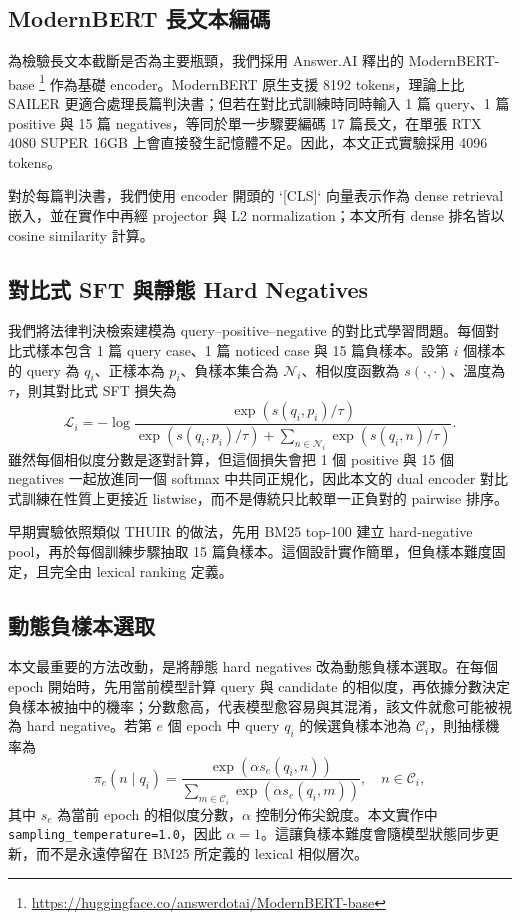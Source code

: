 \subsection{ModernBERT 長文本編碼}

為檢驗長文本截斷是否為主要瓶頸，我們採用 Answer.AI 釋出的 ModernBERT-base \cite{warner2024modernbert}\footnote{\url{https://huggingface.co/answerdotai/ModernBERT-base}} 作為基礎 encoder。ModernBERT 原生支援 8192 tokens，理論上比 SAILER 更適合處理長篇判決書；但若在對比式訓練時同時輸入 1 篇 query、1 篇 positive 與 15 篇 negatives，等同於單一步驟要編碼 17 篇長文，在單張 RTX 4080 SUPER 16GB 上會直接發生記憶體不足。因此，本文正式實驗採用 4096 tokens。

對於每篇判決書，我們使用 encoder 開頭的 `[CLS]` 向量表示作為 dense retrieval 嵌入，並在實作中再經 projector 與 L2 normalization；本文所有 dense 排名皆以 cosine similarity 計算。

\subsection{對比式 SFT 與靜態 Hard Negatives}

我們將法律判決檢索建模為 query--positive--negative 的對比式學習問題。每個對比式樣本包含 1 篇 query case、1 篇 noticed case 與 15 篇負樣本。設第 $i$ 個樣本的 query 為 $q_i$、正樣本為 $p_i$、負樣本集合為 $\mathcal{N}_i$、相似度函數為 $s(\cdot,\cdot)$、溫度為 $\tau$，則其對比式 SFT 損失為
\begin{equation}
\mathcal{L}_i=
-\log
\frac{\exp\left(s(q_i,p_i)/\tau\right)}
{\exp\left(s(q_i,p_i)/\tau\right)+\sum_{n \in \mathcal{N}_i}\exp\left(s(q_i,n)/\tau\right)}.
\end{equation}
雖然每個相似度分數是逐對計算，但這個損失會把 1 個 positive 與 15 個 negatives 一起放進同一個 softmax 中共同正規化，因此本文的 dual encoder 對比式訓練在性質上更接近 listwise，而不是傳統只比較單一正負對的 pairwise 排序。

早期實驗依照類似 THUIR 的做法，先用 BM25 top-100 建立 hard-negative pool，再於每個訓練步驟抽取 15 篇負樣本。這個設計實作簡單，但負樣本難度固定，且完全由 lexical ranking 定義。

\subsection{動態負樣本選取}

本文最重要的方法改動，是將靜態 hard negatives 改為動態負樣本選取。在每個 epoch 開始時，先用當前模型計算 query 與 candidate 的相似度，再依據分數決定負樣本被抽中的機率；分數愈高，代表模型愈容易與其混淆，該文件就愈可能被視為 hard negative。若第 $e$ 個 epoch 中 query $q_i$ 的候選負樣本池為 $\mathcal{C}_i$，則抽樣機率為
\begin{equation}
\pi_e(n \mid q_i)=
\frac{\exp\left(\alpha s_e(q_i,n)\right)}
{\sum_{m \in \mathcal{C}_i}\exp\left(\alpha s_e(q_i,m)\right)},
\quad n \in \mathcal{C}_i,
\end{equation}
其中 $s_e$ 為當前 epoch 的相似度分數，$\alpha$ 控制分佈尖銳度。本文實作中 \texttt{sampling\_temperature=1.0}，因此 $\alpha=1$。這讓負樣本難度會隨模型狀態同步更新，而不是永遠停留在 BM25 所定義的 lexical 相似層次。

